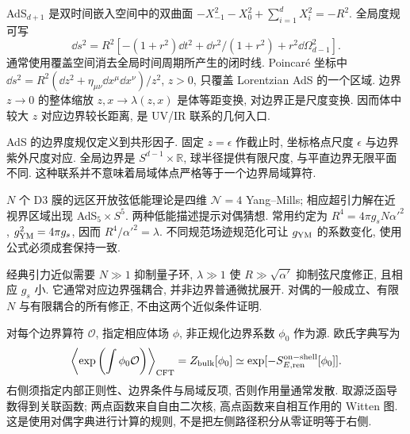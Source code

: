 \label{ch:AdS}
AdS$_{d+1}$ 是双时间嵌入空间中的双曲面 $-X_{-1}^2-X_0^2+\sum_{i=1}^dX_i^2=-R^2$. 全局度规可写
\begin{equation}
\dd s^2=R^2[-(1+r^2)\dd t^2+\dd r^2/(1+r^2)+r^2\dd\Omega_{d-1}^2].
\end{equation}
通常使用覆盖空间消去全局时间周期所产生的闭时线. Poincaré 坐标中 $\dd s^2=R^2(\dd z^2+\eta_{\mu\nu}\dd x^\mu\dd x^\nu)/z^2$, $z>0$, 只覆盖 Lorentzian AdS 的一个区域. 边界 $z\to0$ 的整体缩放 $z,x\to\lambda(z,x)$ 是体等距变换, 对边界正是尺度变换. 因而体中较大 $z$ 对应边界较长距离, 是 UV/IR 联系的几何入口.

AdS 的边界度规仅定义到共形因子. 固定 $z=\epsilon$ 作截止时, 坐标格点尺度 $\epsilon$ 与边界紫外尺度对应. 全局边界是 $S^{d-1}\times\mathbb R$, 球半径提供有限尺度, 与平直边界无限平面不同. 这种联系并不意味着局域体点严格等于一个边界局域算符.

$N$ 个 D3 膜的远区开放弦低能理论是四维 $\mathcal N=4$ Yang--Mills; 相应超引力解在近视界区域出现 AdS$_5\times S^5$. 两种低能描述提示对偶猜想. 常用约定为
$R^4=4\pi g_sN\alpha'^2$, $g_{\rm YM}^2=4\pi g_s$, 因而 $R^4/\alpha'^2=\lambda$.
不同规范场迹规范化可让 $g_{\rm YM}$ 的系数变化, 使用公式必须成套保持一致.

经典引力近似需要 $N\gg1$ 抑制量子环, $\lambda\gg1$ 使 $R\gg\sqrt{\alpha'}$ 抑制弦尺度修正, 且相应 $g_s$ 小. 它通常对应边界强耦合, 并非边界普通微扰展开. 对偶的一般成立、有限 $N$ 与有限耦合的所有修正, 不由这两个近似条件证明.

对每个边界算符 $\mathcal O$, 指定相应体场 $\phi$, 非正规化边界系数 $\phi_0$ 作为源. 欧氏字典写为
\begin{equation}\label{eq:GKPW}
\left\langle\exp\left(\int\phi_0\mathcal O\right)\right\rangle_{\rm CFT}
=Z_{
\rm bulk}[\phi_0]\simeq\exp[-S_{E,\rm ren}^{\rm on-shell}[\phi_0]].
\end{equation}
右侧须指定内部正则性、边界条件与局域反项, 否则作用量通常发散. 取源泛函导数得到关联函数; 两点函数来自自由二次核, 高点函数来自相互作用的 Witten 图. 这是使用对偶字典进行计算的规则, 不是把左侧路径积分从零证明等于右侧.
